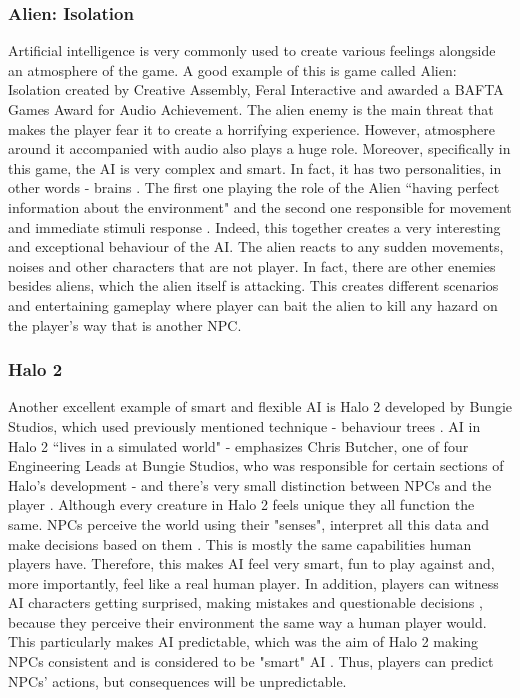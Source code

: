 \documentclass[journal]{IEEEtran}
\begin{document}
\subsubsection{Alien: Isolation}
Artificial intelligence is very commonly used to create various feelings alongside an atmosphere of the game. A good example of this is game called Alien: Isolation created by Creative Assembly, Feral Interactive and awarded a BAFTA Games Award for Audio Achievement. The alien enemy is the main threat that makes the player fear it to create a horrifying experience. However, atmosphere around it accompanied with audio also plays a huge role. Moreover, specifically in this game, the AI is very complex and smart. In fact, it has two personalities, in other words - brains \cite{seller2019horrific}. The first one playing the role of the Alien ``having perfect information about the environment" \cite{seller2019horrific} and the second one responsible for movement and immediate stimuli response \cite{seller2019horrific}. Indeed, this together creates a very interesting and exceptional behaviour of the AI. The alien reacts to any sudden movements, noises and other characters that are not player. In fact, there are other enemies besides aliens, which the alien itself is attacking. This creates different scenarios and entertaining gameplay where player can bait the alien to kill any hazard on the player's way that is another NPC.

\subsubsection{Halo 2}
Another excellent example of smart and flexible AI is Halo 2 developed by Bungie Studios, which used previously mentioned technique - behaviour trees \cite{behaviourtreeofhalo2}. AI in Halo 2 ``lives in a simulated world" \cite{halo2} - emphasizes Chris Butcher, one of four Engineering Leads at Bungie Studios, who was responsible for certain sections of Halo's development - and there's very small distinction between NPCs and the player \cite{halo2}. Although every creature in Halo 2 feels unique they all function the same. NPCs perceive the world using their "senses", interpret all this data and make decisions based on them \cite{halo2}. This is mostly the same capabilities human players have. Therefore, this makes AI feel very smart, fun to play against and, more importantly, feel like a real human player. In addition, players can witness AI characters getting surprised, making mistakes and questionable decisions \cite{halo2}, because they perceive their environment the same way a human player would. This particularly makes AI predictable, which was the aim of Halo 2 making NPCs consistent \cite{halo2} and is considered to be "smart" AI \cite{gamemakertoolkit}. Thus, players can predict NPCs' actions, but consequences will be unpredictable.
\end{document}
